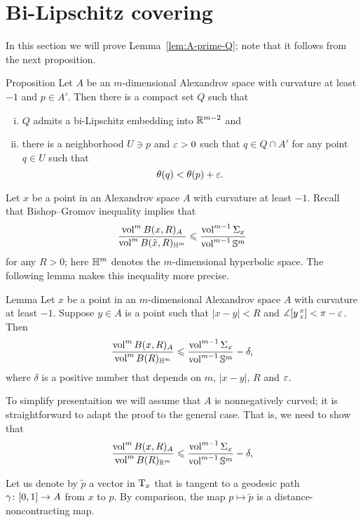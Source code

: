 \section{Bi-Lipschitz covering}\label{sec:bilip}

In this section we will prove Lemma~\ref{lem:A-prime-Q};
note that it follows from the next proposition.

\begin{thm}{Proposition}\label{prop:Q-covering}
Let $A$ be an $m$-dimensional Alexandrov space with curvature at least $-1$ and $p\in A'$.
Then there is a compact set $Q$ such that 
\begin{enumerate}[(i)]
 \item $Q$ admits a bi-Lipschitz embedding into $\mathbb{R}^{m-2}$ and
 \item there is a neighborhood $U\ni p$ and $\varepsilon>0$ such that $q\in Q\cap A'$ for any point $q\in U$ such that 
 \[\theta(q)<\theta(p)+\varepsilon.\]
\end{enumerate}
\end{thm}

Let $x$ be a point in an Alexandrov space $A$ with curvature at least $-1$.
Recall that Bishop--Gromov inequality implies that 
\[\frac{\operatorname{vol}^m B(x,R)_A}{\operatorname{vol}^m B(\tilde x,R)_{\mathbb{H}^m}}\leqslant \frac{\operatorname{vol}^{m-1} \Sigma_x}{\operatorname{vol}^{m-1} \mathbb{S}^m}\]
for any $R>0$; here $\mathbb{H}^m$ denotes the $m$-dimensional hyperbolic space.
The following lemma makes this inequality more precise. 

\begin{thm}{Lemma}
Let $x$ be a point in an $m$-dimensional Alexandrov space $A$ with curvature at least $-1$.
Suppose $y\in A$ is a point such that $|x-y|<R$ and $\measuredangle[y\,{}^{x}_{z}]<\pi-\varepsilon$.
Then
\[\frac{\operatorname{vol}^m B(x,R)_A}{\operatorname{vol}^m B(R)_{\mathbb{H}^m}}\leqslant \frac{\operatorname{vol}^{m-1} \Sigma_x}{\operatorname{vol}^{m-1} \mathbb{S}^m}-\delta,\]
where $\delta$ is a positive number that depends on $m$, $|x-y|$, $R$ and $\varepsilon$.
 
\end{thm}

To simplify presentaition we will assume that $A$ is nonnegatively curved;
it is straightforward to adapt the proof to the general case.
That is, we need to show that 
\[\frac{\operatorname{vol}^m B(x,R)_A}{\operatorname{vol}^m B(R)_{\mathbb{R}^m}}\leqslant \frac{\operatorname{vol}^{m-1} \Sigma_x}{\operatorname{vol}^{m-1} \mathbb{S}^m}-\delta,\]

Let us denote by $\tilde p$ a vector in $\mathrm{T}_x$ that is tangent to a geodesic path $\gamma\:[0,1]\zz\to A$ from $x$ to $p$.
By comparison, the map $p\mapsto \tilde p$ is a distance-noncontracting map.

